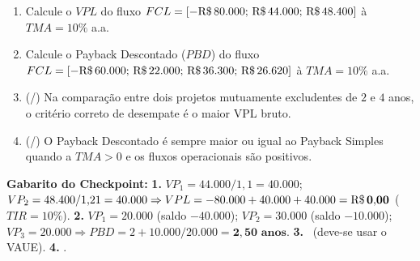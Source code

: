 \begin{boxTeste}
\begin{enumerate}[leftmargin=1.5em, itemsep=4pt]
  \item Calcule o $VPL$ do fluxo $FCL = [-\text{R\$\,}{80.000};\, \text{R\$\,}{44.000};\, \text{R\$\,}{48.400}]$ à $TMA = 10\%$ a.a.
  \item Calcule o Payback Descontado ($PBD$) do fluxo $FCL = [-\text{R\$\,}{60.000};\, \text{R\$\,}{22.000};\, \text{R\$\,}{36.300};\, \text{R\$\,}{26.620}]$ à $TMA = 10\%$ a.a.
  \item (\V/\F) Na comparação entre dois projetos mutuamente excludentes de $2$ e $4$ anos, o critério correto de desempate é o maior VPL bruto.
  \item (\V/\F) O Payback Descontado é sempre maior ou igual ao Payback Simples quando a $TMA > 0$ e os fluxos operacionais são positivos.
\end{enumerate}
\vspace{4pt}
\noindent\textbf{Gabarito do Checkpoint:} \textbf{1.} $VP_1 = 44.000/1{,}1 = 40.000$; $VP_2 = 48.400/1{,}21 = 40.000 \Rightarrow VPL = -80.000 + 40.000 + 40.000 = \mathbf{\text{R\$\,}{0{,}00}}$ ($TIR = 10\%$). \quad \textbf{2.} $VP_1 = 20.000$ (saldo $-40.000$); $VP_2 = 30.000$ (saldo $-10.000$); $VP_3 = 20.000 \Rightarrow PBD = 2 + 10.000/20.000 = \mathbf{2{,}50\text{ anos}}$. \quad \textbf{3.} \F\ (deve-se usar o VAUE). \quad \textbf{4.} \V.
\end{boxTeste}
